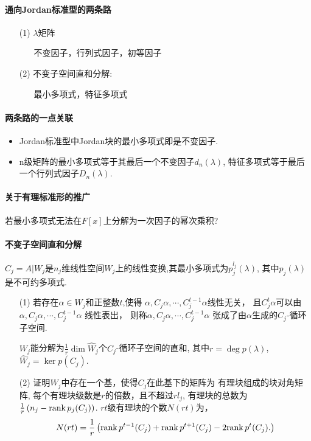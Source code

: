 \paragraph{通向Jordan标准型的两条路}
\begin{itemize}
    \item[(1)] $\lambda$矩阵
        \begin{itemize}
            \item[] 不变因子，行列式因子，初等因子
        \end{itemize} 
    \item[(2)] 不变子空间直和分解: 
        \begin{itemize}
            \item[] 最小多项式，特征多项式
        \end{itemize}
\end{itemize}

\paragraph{两条路的一点关联}
\begin{itemize}
    \item Jordan标准型中Jordan块的最小多项式即是不变因子.
    \item n级矩阵的最小多项式等于其最后一个不变因子$d_n(\lambda)$,
          特征多项式等于最后一个行列式因子$D_n(\lambda)$.
\end{itemize}

\paragraph{关于有理标准形的推广}
若最小多项式无法在$F[x]$上分解为一次因子的幂次乘积?
\paragraph{不变子空间直和分解}
$C_j = A|W_j$是$n_j$维线性空间$W_j$上的线性变换,其最小多项式为$p_j^{l_j}(\lambda)$,
其中$p_j(\lambda)$是不可约多项式.
\begin{itemize}
    \item [(1)] 若存在$\alpha \in W_j$和正整数$t$,使得
    $\alpha, C_j\alpha, \cdots, C_j^{t-1} \alpha$线性无关，
    且$C_j^t \alpha$可以由$\alpha, C_j\alpha, \cdots, C_j^{t-1} \alpha$
    线性表出， 则称$\alpha, C_j\alpha, \cdots, C_j^{t-1} \alpha$
    张成了由$\alpha$生成的$C_j$-循环子空间.

    $W_j$能分解为$\frac{1}{r} \dim \widehat{W}_j$个$C_j$-循环子空间的直和,
    其中$r=\deg p(\lambda)$, $\widehat{W}_j = \ker p(C_j)$.
    \vspace{1cm}
    \item [(2)] 证明$W_j$中存在一个基，使得$C_j$在此基下的矩阵为
    有理块组成的块对角矩阵, 每个有理块级数是$r$的倍数，且不超过$rl_j$,
    有理块的总数为$\frac{1}{r}\left(n_j - \mathrm{rank}\, p_j(C_j)\right)$.
    $rt$级有理块的个数$N(rt)$为，
    $$N(rt) = \frac{1}{r} \left(
        \mathrm{rank}\,p^{t-1}(C_j) + \mathrm{rank}\,p^{t+1}(C_j) 
        - 2\mathrm{rank}\,p^{t}(C_j).
    \right)$$
    \vspace{1cm}
\end{itemize}

